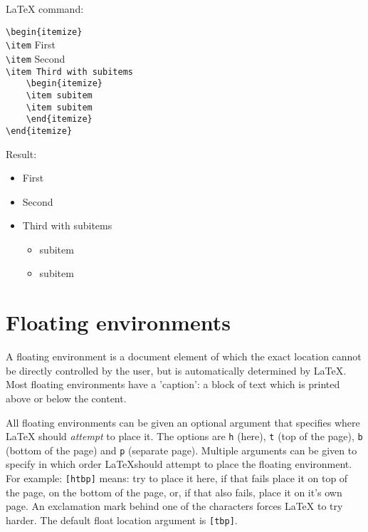 \documentclass{article}
\begin{document}
\begin{minipage}[t]{0.5\textwidth}
{\LaTeX} command:
\vspace{3mm}

\verb|\begin{itemize}|\\
\verb|\item| First\\
\verb|\item| Second\\
\verb|\item Third with subitems|\\
\verb|    \begin{itemize}|\\
\verb|    \item subitem|\\
\verb|    \item subitem|\\
\verb|    \end{itemize}|\\
\verb|\end{itemize}|\\
\end{minipage}
\begin{minipage}[t]{0.5\textwidth}
Result:

\begin{itemize}
\item First
\item Second
\item Third with subitems
	\begin{itemize}
	\item subitem
	\item subitem
	\end{itemize}
\end{itemize}
\end{minipage}

\section{Floating environments}

A floating environment is a document element of which the exact location cannot be directly controlled by the user, but is automatically determined by \LaTeX. Most floating environments have a 'caption': a block of text which is printed above or below the content.

All floating environments can be given an optional argument that specifies where \LaTeX{} should \emph{attempt} to place it. The options are \verb|h| (here), \verb|t| (top of the page), \verb|b| (bottom of the page) and \verb|p| (separate page). Multiple arguments can be given to specify in which order \LaTeX should attempt to place the floating environment. For example: \verb|[htbp]| means: try to place it here, if that fails place it on top of the page, on the bottom of the page, or, if that also fails, place it on it's own page. An exclamation mark behind one of the characters forces \LaTeX{} to try harder. The default float location argument is \verb|[tbp]|.
\end{document}

